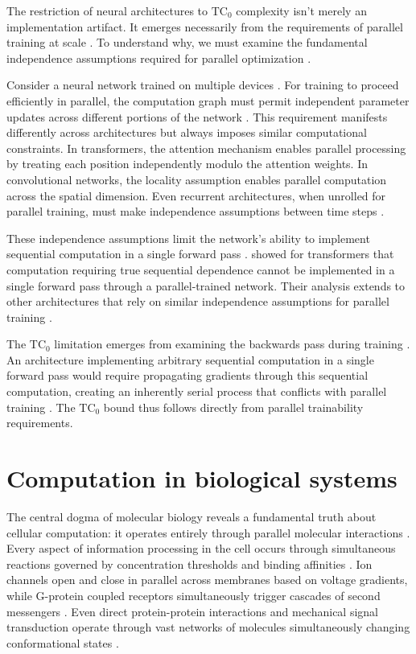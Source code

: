 \documentclass[12pt]{article}
\begin{document}
The restriction of neural architectures to $\text{TC}_0$ complexity isn't merely an implementation artifact.
It emerges necessarily from the requirements of parallel training at scale \cite{merrill2023parallelism,peng2024limitations}.
To understand why, we must examine the fundamental independence assumptions required for parallel optimization \cite{shallue2019measuring}.

Consider a neural network trained on multiple devices \cite{zhao2024epha}.
For training to proceed efficiently in parallel, the computation graph must permit independent parameter updates across different portions of the network \cite{barrett2019analyzing}.
This requirement manifests differently across architectures but always imposes similar computational constraints.
In transformers, the attention mechanism enables parallel processing by treating each position independently modulo the attention weights.
In convolutional networks, the locality assumption enables parallel computation across the spatial dimension.
Even recurrent architectures, when unrolled for parallel training, must make independence assumptions between time steps \cite{dickson2023rnns}.

These independence assumptions limit the network's ability to implement sequential computation in a single forward pass \cite{wei2022chain}.
\cite{merrill2023parallelism} showed for transformers that computation requiring true sequential dependence cannot be implemented in a single forward pass through a parallel-trained network.
Their analysis extends to other architectures that rely on similar independence assumptions for parallel training \cite{stillman2023generative}.

The $\text{TC}_0$ limitation emerges from examining the backwards pass during training \cite{jung2020new}.
An architecture implementing arbitrary sequential computation in a single forward pass would require propagating gradients through this sequential computation, creating an inherently serial process that conflicts with parallel training \cite{zhu2024overcoming}.
The $\text{TC}_0$ bound thus follows directly from parallel trainability requirements.

\section{Computation in biological systems}

The central dogma of molecular biology reveals a fundamental truth about cellular computation: it operates entirely through parallel molecular interactions \cite{wang2023parallel,cai2024efficient,fu2023scgrn}.
Every aspect of information processing in the cell occurs through simultaneous reactions governed by concentration thresholds and binding affinities \cite{alberts2022molecular}.
Ion channels open and close in parallel across membranes based on voltage gradients, while G-protein coupled receptors simultaneously trigger cascades of second messengers \cite{alberts2022molecular}.
Even direct protein-protein interactions and mechanical signal transduction operate through vast networks of molecules simultaneously changing conformational states \cite{alberts2022molecular,berridge2014cell}.
\end{document}
